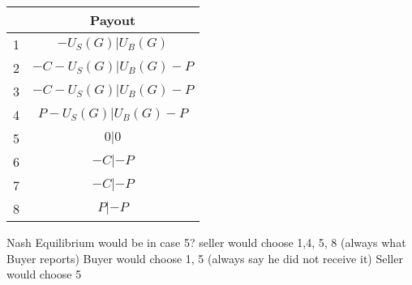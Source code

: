 \documentclass{cacthesis}
\begin{document}
\begin{center}
\begin{tabular}{ |c|c| }
\hline
& Payout  \\
\hline
\hline
1& $-U_S(G)| U_B(G)$\\
\hline
2& $-C-U_S(G)| U_B(G)-P$\\
\hline
3&$-C-U_S(G)|U_B(G) -P$ \\
\hline
4& $P-U_S(G)| U_B(G) - P$\\
\hline
5& $0|0$\\
\hline 
6& $-C | -P$\\
\hline
7& $-C|-P$\\
\hline
8& $P| -P$\\
\hline
\end{tabular}
\end{center}
Nash Equilibrium would be in case 5?\newline
seller would choose 1,4, 5, 8 (always what Buyer reports)\newline
Buyer would choose 1, 5 (always say he did not receive it)\newline
Seller would choose 5
\end{document}
